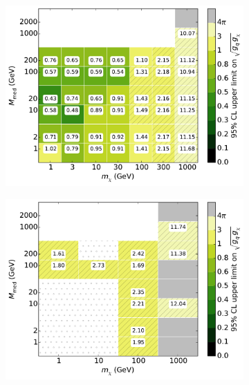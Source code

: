\begin{figure}[h]
\begin{subfigure}[t]{0.325\textwidth}
      \includegraphics[width=1.\textwidth]{figures/grid_allpoints_SVD_rat1.pdf}
      \caption{}
    \end{subfigure}
    \begin{subfigure}[t]{0.325\textwidth}
      \centering
      \includegraphics[width=1.\textwidth]{figures/grid_basepoints_SVD_rat1_monoWZ.pdf}
      \caption{}
    \end{subfigure}
    \begin{subfigure}[t]{0.325\textwidth}
      \centering

\end{subfigure}
\end{figure}
